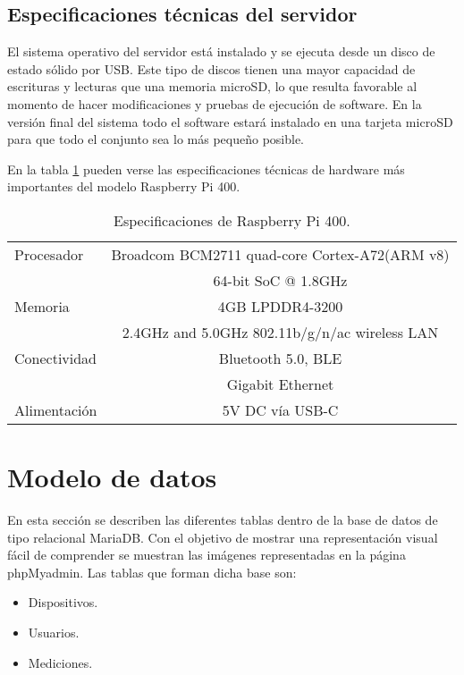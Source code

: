 \subsection{Especificaciones técnicas del servidor}

El sistema operativo del servidor está instalado y se ejecuta desde un disco de estado sólido por USB. Este tipo de discos tienen una mayor capacidad de escrituras y lecturas que una memoria microSD, lo que resulta favorable al momento de hacer modificaciones y pruebas de ejecución de software. En la versión final del sistema todo el software estará instalado en una tarjeta microSD para que todo el conjunto sea lo más pequeño posible.

En la tabla \ref{tab:Especificaciones Raspberry Pi 400} pueden verse las especificaciones técnicas de hardware más importantes del modelo Raspberry Pi 400.

\begin{table}[h]
\centering
\caption[Raspberry Pi 400]{Especificaciones de Raspberry Pi 400.}
\begin{tabular}{l c}
\toprule
Procesador		&	Broadcom BCM2711 quad-core Cortex-A72(ARM v8) \\
				&	64-bit SoC @ 1.8GHz \\
\midrule
Memoria			&	4GB LPDDR4-3200 \\
\midrule
				&	2.4GHz and 5.0GHz 802.11b/g/n/ac wireless LAN \\
Conectividad		&	Bluetooth 5.0, BLE\\
				&   Gigabit Ethernet \\
\midrule
Alimentación		&	5V DC vía USB-C\\
\bottomrule
\hline
\end{tabular}
\label{tab:Especificaciones Raspberry Pi 400}
\end{table}

\section{Modelo de datos}

En esta sección se describen las diferentes tablas dentro de la base de datos de tipo relacional MariaDB. Con el objetivo de mostrar una representación visual fácil de comprender se muestran las imágenes representadas en la página phpMyadmin. Las tablas que forman dicha base son:

\begin{itemize}
	\item Dispositivos.
	\item Usuarios.
	\item Mediciones.
\end{itemize}

